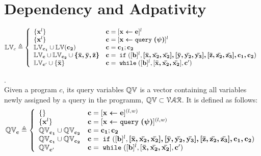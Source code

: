 %
\section{Dependency and Adpativity}
\begin{defn}
$$
  \lvar_{c} \triangleq
  \left\{
  \begin{array}{ll}
      \{\ssa{x}^l\}                   
      & \ssa{c} = [\ssa{\assign x e}]^{l} 
      \\
      \{\ssa{x}^l\}                   
      & \ssa{c} = [\ssa{\assign x \query(\qexpr)}]^{l} 
      \\
      \lvar_{\ssa{c_1}} \cup \lvar{(\ssa{c_2})}  
      & \ssa{c} = \ssa{c_1};\ssa{c_2}
      \\
      \lvar_{\ssa{c}} \cup \lvar_{\ssa{c_2}} \cup \ssa{\{\bar{x}, \bar{y}, \bar{z}\}} 
      & \ssa{c} =\eif([\sbexpr]^{l} , \ssa{[\bar{x}, \bar{x_2}, \bar{x_2}], 
      [\bar{y}, \bar{y_2}, \bar{y_3}], 
      [\bar{z}, \bar{z_2}, \bar{z_3}], c_1, c_2}) 
      \\
      \lvar_{\ssa{c}'} \cup \{\ssa{\bar{x}}\}
      & \ssa{c}   = \ewhile ([\sbexpr]^{l}, [\ssa{\bar{x}, \bar{x_2}, \bar{x_2}}], \ssa{c}')
\end{array}
\right.
$$
\end{defn}
%
\begin{defn}.
\\
Given a program $c$, its query variables $\mathbb{QV}$ is a vector containing all variables newly assigned by a query in the programm, $\mathbb{QV} \subset \mathcal{VAR}$.
It is defined as follows:
$$
  \qvar_{\ssa{c}} \triangleq
  \left\{
  \begin{array}{ll}
      \{\}                  
      & \ssa{c} = [\ssa{\assign x e}]^{(l, w)} 
      \\
      \{\ssa{x}^l\}                  
      & \ssa{c} = [\ssa{\assign x \query(\qexpr)}]^{(l, w)} 
      \\
      \qvar_{\ssa{c_1}} \cup \qvar_{\ssa{c_2}}  
      & \ssa{c} = \ssa{c_1};\ssa{c_2}
      \\
      \qvar_{\ssa{c_1}} \cup \qvar_{\ssa{c_2}} 
      & \ssa{c} =\eif([\sbexpr]^{l} , \ssa{[\bar{x}, \bar{x_2}, \bar{x_2}], 
      [\bar{y}, \bar{y_2}, \bar{y_3}], 
      [\bar{z}, \bar{z_2}, \bar{z_3}], c_1, c_2}) 
      \\
      \qvar_{\ssa{c}'}
      & \ssa{c}   = \ewhile ([\sbexpr]^{l}, [\ssa{\bar{x}, \bar{x_2}, \bar{x_2}}], \ssa{c}')
\end{array}
\right.
$$
\end{defn}
%
%
%
